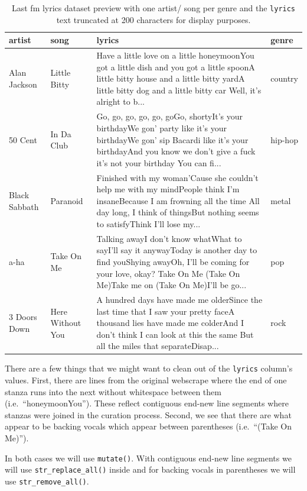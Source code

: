 \documentclass[
  letterpaper,
]{latex/krantz}
\begin{document}
\hypertarget{tbl-td-lastfm-read-preview}{}
\begin{table}
\caption{\label{tbl-td-lastfm-read-preview}Last fm lyrics dataset preview with one artist/ song per genre and the
\texttt{lyrics} text truncated at 200 characters for display purposes. }\tabularnewline

\centering
\begin{tabular}{llll}
\toprule
artist & song & lyrics & genre\\
\midrule
Alan Jackson & Little Bitty & Have a little love on a little honeymoonYou got a little dish and you got a little spoonA little bitty house and a little bitty yardA little bitty dog and a little bitty car Well, it's alright to b... & country\\
50 Cent & In Da Club & Go, go, go, go, go, goGo, shortyIt's your birthdayWe gon' party like it's your birthdayWe gon' sip Bacardi like it's your birthdayAnd you know we don't give a fuck it's not your birthday You can fi... & hip-hop\\
Black Sabbath & Paranoid & Finished with my woman'Cause she couldn't help me with my mindPeople think I'm insaneBecause I am frowning all the time All day long, I think of thingsBut nothing seems to satisfyThink I'll lose my... & metal\\
a-ha & Take On Me & Talking awayI don't know whatWhat to sayI'll say it anywayToday is another day to find youShying awayOh, I'll be coming for your love, okay? Take On Me (Take On Me)Take me on (Take On Me)I'll be go... & pop\\
3 Doors Down & Here Without You & A hundred days have made me olderSince the last time that I saw your pretty faceA thousand lies have made me colderAnd I don't think I can look at this the same But all the miles that separateDisap... & rock\\
\bottomrule
\end{tabular}
\end{table}

There are a few things that we might want to clean out of the
\texttt{lyrics} column's values. First, there are lines from the
original webscrape where the end of one stanza runs into the next
without whitespace between them (i.e.~``honeymoonYou''). These reflect
contiguous end-new line segments where stanzas were joined in the
curation process. Second, we see that there are what appear to be
backing vocals which appear between parentheses (i.e.~``(Take On Me)'').

In both cases we will use \texttt{mutate()}. With contiguous end-new
line segments we will use \texttt{str\_replace\_all()} inside and for
backing vocals in parentheses we will use \texttt{str\_remove\_all()}.
\end{document}

